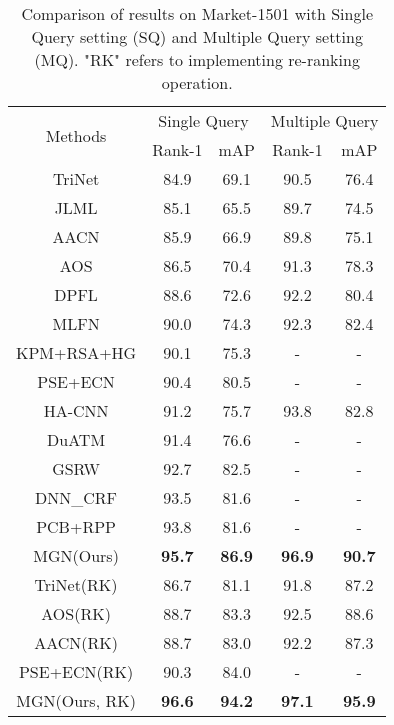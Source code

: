 \documentclass[sigconf]{acmart}
\begin{document}
\begin{table} \small
	\label{tab:comparison_market1501}
	\centering
	\begin{tabular}{c|cc|cc}
		\toprule
		\multirow{2}{*}{Methods} & \multicolumn{2}{c|}{Single Query} & \multicolumn{2}{c}{Multiple Query}\\
		& Rank-1 & mAP & Rank-1 & mAP \\ 
		\midrule
		TriNet\cite{hermans2017defense} & 84.9 & 69.1 & 90.5 & 76.4 \\
		JLML\cite{li2017person} & 85.1 & 65.5 & 89.7 & 74.5 \\
		AACN\cite{xu2018attention} & 85.9 & 66.9 & 89.8 & 75.1 \\
		AOS\cite{huang2018adversarially} & 86.5 & 70.4 & 91.3 & 78.3 \\
		DPFL\cite{chen2017person} & 88.6 & 72.6 & 92.2 & 80.4 \\
		MLFN\cite{chang2018multilevel} & 90.0 & 74.3 & 92.3 & 82.4 \\
		KPM+RSA+HG\cite{shen2018end} & 90.1 & 75.3 & - & - \\
		PSE+ECN\cite{sarfraz2017pose} & 90.4 & 80.5 & - & - \\
		HA-CNN\cite{li2018harmoniou} & 91.2 & 75.7 & 93.8 & 82.8 \\
		DuATM\cite{si2018dual} & 91.4 & 76.6 & - & - \\
		GSRW\cite{shen2018deep} & 92.7 & 82.5 & - & - \\
		DNN\_CRF\cite{chen2018group} & 93.5 & 81.6 & - & - \\
		PCB+RPP\cite{sun2017beyond} & 93.8 & 81.6 & - & - \\
		MGN(Ours) & \textbf{95.7} & \textbf{86.9} & \textbf{96.9} & \textbf{90.7} \\
		\midrule
		TriNet(RK)\cite{hermans2017defense} & 86.7  & 81.1 & 91.8 & 87.2 \\
		AOS(RK)\cite{huang2018adversarially} & 88.7 & 83.3 & 92.5 & 88.6 \\
		AACN(RK)\cite{xu2018attention} & 88.7 & 83.0 & 92.2 & 87.3 \\
		PSE+ECN(RK)\cite{sarfraz2017pose} & 90.3 & 84.0 & - & - \\
		MGN(Ours, RK) & \textbf{96.6} & \textbf{94.2} & \textbf{97.1} & \textbf{95.9}\\
		\bottomrule
	\end{tabular}
	\caption{Comparison of results on Market-1501 with Single Query setting (SQ) and Multiple Query setting (MQ). "RK" refers to implementing re-ranking operation.}
\end{table}
\end{document}
